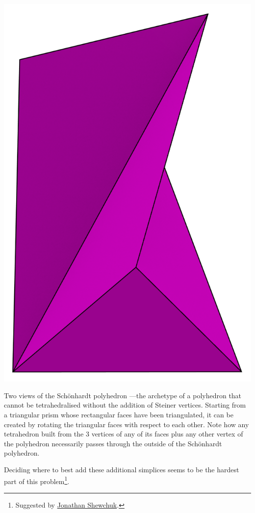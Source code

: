 {\includegraphics[width=\marginparwidth]{figs/schoenhardt2}
\caption[The Sch\"onhardt polyhedron]{Two views of the Sch\"onhardt polyhedron \citep{Schonhardt28}---the archetype of a polyhedron that cannot be tetrahedralised without the addition of Steiner vertices.
Starting from a triangular prism whose rectangular faces have been triangulated, it can be created by rotating the triangular faces with respect to each other.
Note how any tetrahedron built from the 3 vertices of any of its faces plus any other vertex of the polyhedron necessarily passes through the outside of the Sch\"onhardt polyhedron.}
\label{fig:schoenhardt}
}
Deciding where to best add these additional simplices seems to be the hardest part of this problem\footnote{Suggested by \href{http://www.cs.berkeley.edu/~jrs/}{Jonathan Shewchuk}.}. %


